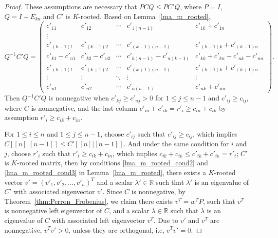 \documentclass[12pt, a4paper]{article}
\theoremstyle{plain}
\theoremstyle{definition}
\begin{document}
\begin{proof}
    These assumptions are necessary that $PCQ \leq PC'Q$, where $P=I$, $Q=I+E_{kn}$ and $C'$ is $K$-rooted. Based on Lemma~\ref{lma_m_rooted},
    $$Q^{-1}C'Q=
        \begin{pmatrix}
        c'_{11}     & c'_{12} & \cdots     & c'_{1 (n-1)} & c'_{1k}+c'_{1n} \\
        \vdots \\
        c'_{(k-1)1}     & c'_{(k-1) 2}           & \cdots     & c'_{(k-1) (n-1)} & c'_{(k-1)k}+c'_{(k-1)n} \\
        c'_{k1}-c'_{n1} & c'_{k2}-c'_{n2} &\cdots      &c'_{k(n-1)}-c'_{n(k-1)}& c'_{kk}+c'_{kn}-c'_{nk}-c'_{nn}\\
        c'_{(k+1)1}     & c'_{(k+1)2}           & \cdots     & c'_{(k+1) (n-1)} & c'_{(k+1)k}+c'_{(k+1)n} \\
        \vdots              & \vdots & \ddots              & \vdots & \vdots \\
        c'_{n1}             & c'_{n2} & \cdots             & c'_{n (n-1)} & c'_{nk}+c'_{nn}
    \end{pmatrix}.$$
    Then $Q^{-1}C'Q$ is nonnegative when $c'_{kj}\geq c'_{nj}>0$ for $1\leq j\leq n-1$ and $c'_{ij}\geq c_{ij}$, where $C$ is nonnegative, and the last column $c'_{in}+c'_{ik}=r'_i \geq c_{in}+c_{ik}$ by assumption $r'_i\geq c_{ik}+c_{in}$.

    For $1\leq i \leq n$ and $1\leq j\leq n-1$, choose $c'_{ij}$ such that $c'_{ij}\geq c_{ij}$, which implies $C[[n]|[n-1]]\leq C'[[n]|[n-1]]$. And under the same condition for $i$ and $j$, choose $r'_i$ such that $r'_i\geq c_{ik}+c_{in}$, which implies $c_{ik}+c_{in}\leq c'_{ik}+c'_{in} = r'_i$; $C'$ is $K$-rooted matrix, then by conditions \ref{lma_m_rooted_cond2} and \ref{lma_m_rooted_cond3} in Lemma~\ref{lma_m_rooted}, there exists a $K$-rooted vector $v'=(v'_1, v'_2, \ldots, v'_n)^T$ and a scalar $\lambda'\in \mathbb{R}$
    such that $\lambda'$ is an eigenvalue of $C'$ with associated eigenvector $v'$.
   Since $C$ is nonnegative, by Theorem~\ref{thm:Perron_Frobenius}, we claim there exists $v^T = w^{T}P$, such that $v^T$ is nonnegative left eigenvector of $C$, and a scalar $\lambda\in \mathbb{R}$ such that $\lambda$ is an eigenvalue of $C$ with associated left eigenvector $v^T$.
    Due to $v'$ and $v^T$ are nonnegative, $v^Tv'>0$, unless they are orthogonal, i.e, $v^Tv'=0$.


\end{proof}
\end{document}
